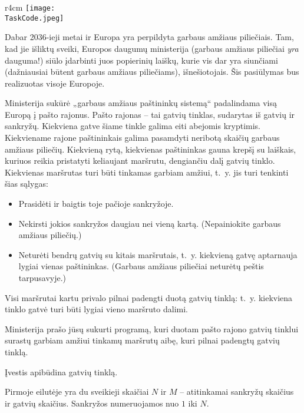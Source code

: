 \documentclass{boi2014-lt}
\renewcommand{\TaskCode}{postmen}
\begin{document}
    \begin{wrapfigure}[8]{r}{4cm}
        \vspace{-18pt}
        \texttt{[image: \\TaskCode.jpeg]}
    \end{wrapfigure}
    Dabar 2036-ieji metai ir Europa yra perpildyta garbaus amžiaus piliečiais.
    Tam, kad jie išliktų sveiki, Europos daugumų ministerija (garbaus amžiaus
    piliečiai \emph{yra} dauguma!) siūlo įdarbinti juos popierinių laiškų,
    kurie vis dar yra siunčiami (dažniausiai būtent garbaus amžiaus piliečiams),
    išnešiotojais. Šis pasiūlymas bus realizuotas visoje Europoje.

    Ministerija sukūrė „garbaus amžiaus paštininkų sistemą“ padalindama visą
    Europą į pašto rajonus. Pašto rajonas -- tai gatvių tinklas, sudarytas iš
    gatvių ir sankryžų. Kiekviena gatve šiame tinkle galima eiti abejomis
    kryptimis. Kiekviename rajone paštininkais galima pasamdyti neribotą skaičių
    garbaus amžiaus piliečių. Kiekvieną rytą, kiekvienas paštininkas gauna krepšį
    su laiškais, kuriuos reikia pristatyti keliaujant maršrutu, dengiančiu dalį
    gatvių tinklo. Kiekvienas maršrutas turi būti tinkamas garbiam amžiui, t.~y.
    jis turi tenkinti šias sąlygas:
    \begin{itemize}
        \item Prasidėti ir baigtis toje pačioje sankryžoje.
        \item Nekirsti jokios sankryžos daugiau nei vieną kartą. (Nepainiokite
            garbaus amžiaus piliečių.)
        \item Neturėti bendrų gatvių su kitais maršrutais, t.~y. kiekvieną gatvę
            aptarnauja lygiai vienas paštininkas. (Garbaus amžiaus piliečiai
            neturėtų peštis tarpusavyje.)
    \end{itemize}

    Visi maršrutai kartu privalo pilnai padengti duotą gatvių tinklą: t.~y.
    kiekviena tinklo gatvė turi būti lygiai vieno maršruto dalimi.

    \Task
    Ministerija prašo jūsų sukurti programą, kuri duotam pašto rajono gatvių
    tinklui surastų garbiam amžiui tinkamų maršrutų aibę, kuri pilnai padengtų
    gatvių tinklą.

    \Input
    Įvestis apibūdina gatvių tinklą.
    
    Pirmoje eilutėje yra du sveikieji skaičiai $N$ ir $M$ -- atitinkamai
    sankryžų skaičius ir gatvių skaičius. Sankryžos numeruojamos nuo $1$ iki $N$.
\end{document}
